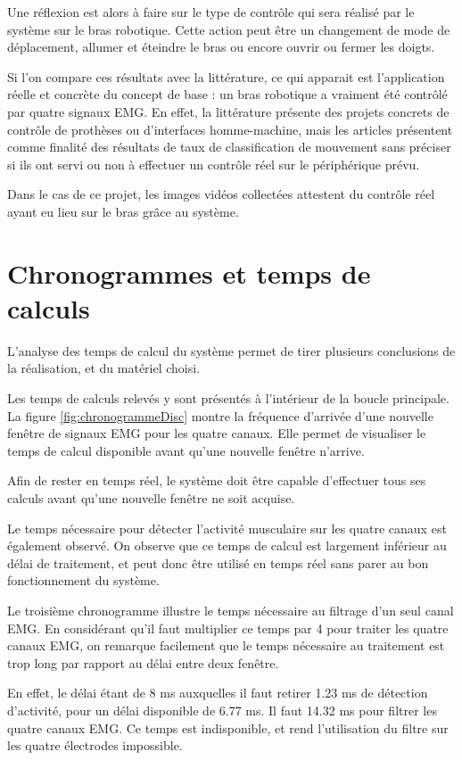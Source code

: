 \documentclass[letterpaper, twoside, 12pt, memoire, creativecommons, hyperref]{thETS}
\begin{document}
Une réflexion est alors à faire sur le type de contrôle qui sera réalisé par le système sur le bras robotique. Cette action peut être un changement de mode de déplacement, allumer et éteindre le bras ou encore ouvrir ou fermer les doigts.

Si l'on compare ces résultats avec la littérature, ce qui apparait est l'application réelle et concrète du concept de base : un bras robotique a vraiment été contrôlé par quatre signaux EMG. En effet, la littérature présente des projets concrets de contrôle de prothèses ou d'interfaces homme-machine, mais les articles présentent comme finalité des résultats de taux de classification de mouvement sans préciser si ils ont servi ou non à effectuer un contrôle réel sur le périphérique prévu.

Dans le cas de ce projet, les images vidéos collectées attestent du contrôle réel ayant eu lieu sur le bras grâce au système.

\section{Chronogrammes et temps de calculs}

L'analyse des temps de calcul du système permet de tirer plusieurs conclusions de la réalisation, et du matériel choisi. 

Les temps de calculs relevés y sont présentés à l'intérieur de la boucle principale. La figure \ref{fig:chronogrammeDisc} montre la fréquence d'arrivée d'une nouvelle fenêtre de signaux EMG pour les quatre canaux. Elle permet de visualiser le temps de calcul disponible avant qu'une nouvelle fenêtre n'arrive. 

Afin de rester en temps réel, le système doit être capable d'effectuer tous ses calculs avant qu'une nouvelle fenêtre ne soit acquise. 

Le temps nécessaire pour détecter l'activité musculaire sur les quatre canaux est également observé. On observe que ce temps de calcul est largement inférieur au délai de traitement, et peut donc être utilisé en temps réel sans parer au bon fonctionnement du système.

Le troisième chronogramme illustre le temps nécessaire au filtrage d'un seul canal EMG. En considérant qu'il faut multiplier ce temps par 4 pour traiter les quatre canaux EMG, on remarque facilement que le temps nécessaire au traitement est trop long par rapport au délai entre deux fenêtre. 

En effet, le délai étant de 8 ms auxquelles il faut retirer 1.23 ms de détection d'activité, pour un délai disponible de 6.77 ms. Il faut 14.32 ms pour filtrer les quatre canaux EMG. Ce temps est indisponible, et rend l'utilisation du filtre sur les quatre électrodes impossible.
\end{document}
